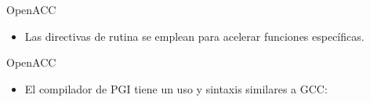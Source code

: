 \documentclass[aspectratio=169]{beamer}
\begin{document}
\begin{frame}{OpenACC}
    \begin{itemize}
        \item Las directivas de rutina se emplean para acelerar funciones específicas.
    \end{itemize}

    \begin{figure}
        \centering
    \end{figure}
\end{frame}

\begin{frame}{OpenACC}
    \begin{itemize}
        \item El compilador de PGI tiene un uso y sintaxis similares a GCC:
    \end{itemize}

    \begin{figure}
        \centering
    \end{figure}
\end{frame}
\end{document}
